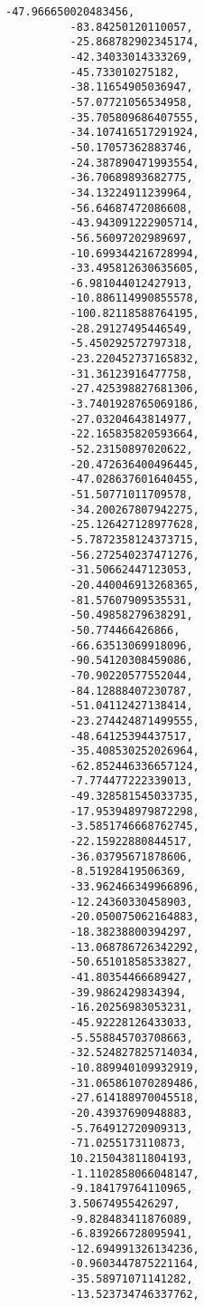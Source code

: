 \documentclass[11pt]{article}
\begin{document}
\begin{Verbatim}[commandchars=\\\{\}]
          -47.966650020483456,
          -83.84250120110057,
          -25.868782902345174,
          -42.34033014333269,
          -45.733010275182,
          -38.11654905036947,
          -57.07721056534958,
          -35.705809686407555,
          -34.107416517291924,
          -50.17057362883746,
          -24.387890471993554,
          -36.70689893682775,
          -34.13224911239964,
          -56.64687472086608,
          -43.943091222905714,
          -56.56097202989697,
          -10.699344216728994,
          -33.495812630635605,
          -6.981044012427913,
          -10.886114990855578,
          -100.82118588764195,
          -28.29127495446549,
          -5.450292572797318,
          -23.220452737165832,
          -31.36123916477758,
          -27.425398827681306,
          -3.7401928765069186,
          -27.03204643814977,
          -22.165835820593664,
          -52.23150897020622,
          -20.472636400496445,
          -47.028637601640455,
          -51.50771011709578,
          -34.200267807942275,
          -25.126427128977628,
          -5.7872358124373715,
          -56.272540237471276,
          -31.50662447123053,
          -20.440046913268365,
          -81.57607909535531,
          -50.49858279638291,
          -50.774466426866,
          -66.63513069918096,
          -90.54120308459086,
          -70.90220577552044,
          -84.12888407230787,
          -51.04112427138414,
          -23.274424871499555,
          -48.64125394437517,
          -35.408530252026964,
          -62.852446336657124,
          -7.774477222339013,
          -49.328581545033735,
          -17.953948979872298,
          -3.5851746668762745,
          -22.15922880844517,
          -36.03795671878606,
          -8.51928419506369,
          -33.962466349966896,
          -12.24360330458903,
          -20.050075062164883,
          -18.38238800394297,
          -13.068786726342292,
          -50.65101858533827,
          -41.80354466689427,
          -39.9862429834394,
          -16.20256983053231,
          -45.92228126433033,
          -5.558845703708663,
          -32.524827825714034,
          -10.889940109932919,
          -31.065861070289486,
          -27.614188970045518,
          -20.43937690948883,
          -5.764912720909313,
          -71.0255173110873,
          10.215043811804193,
          -1.1102858066048147,
          -9.184179764110965,
          3.50674955426297,
          -9.828483411876089,
          -6.839266728095941,
          -12.694991326134236,
          -0.9603447875221164,
          -35.58971071141282,
          -13.523734746337762,

\end{Verbatim}
\end{document}

